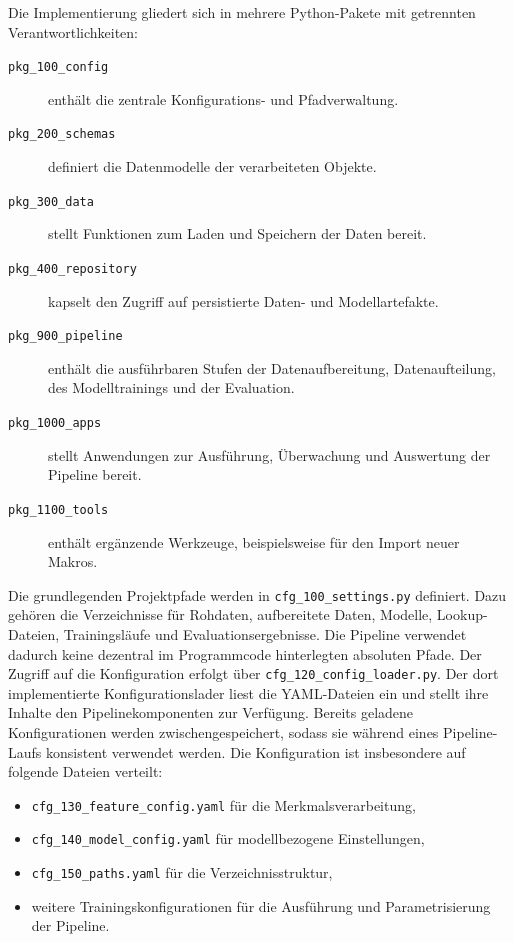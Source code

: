 Die Implementierung gliedert sich in mehrere Python-Pakete mit getrennten Verantwortlichkeiten: 
\begin{description} 
    \item[\texttt{pkg\_100\_config}] enthält die zentrale Konfigurations- und Pfadverwaltung. 
    \item[\texttt{pkg\_200\_schemas}] definiert die Datenmodelle der verarbeiteten Objekte. 
    \item[\texttt{pkg\_300\_data}] stellt Funktionen zum Laden und Speichern der Daten bereit. 
    \item[\texttt{pkg\_400\_repository}] kapselt den Zugriff auf persistierte Daten- und Modellartefakte. 
    \item[\texttt{pkg\_900\_pipeline}] enthält die ausführbaren Stufen der Datenaufbereitung, Datenaufteilung, des Modelltrainings und der Evaluation. 
    \item[\texttt{pkg\_1000\_apps}] stellt Anwendungen zur Ausführung, Überwachung und Auswertung der Pipeline bereit. 
    \item[\texttt{pkg\_1100\_tools}] enthält ergänzende Werkzeuge, beispielsweise für den Import neuer Makros. 
\end{description} 

Die grundlegenden Projektpfade werden in \texttt{cfg\_100\_settings.py} definiert. Dazu gehören die Verzeichnisse für Rohdaten, aufbereitete Daten, Modelle, Lookup-Dateien, Trainingsläufe und Evaluationsergebnisse. 
Die Pipeline verwendet dadurch keine dezentral im Programmcode hinterlegten absoluten Pfade. Der Zugriff auf die Konfiguration erfolgt über \texttt{cfg\_120\_config\_loader.py}. 
Der dort implementierte Konfigurationslader liest die YAML-Dateien ein und stellt ihre Inhalte den Pipelinekomponenten zur Verfügung. Bereits geladene Konfigurationen werden zwischengespeichert, 
sodass sie während eines Pipeline-Laufs konsistent verwendet werden. Die Konfiguration ist insbesondere auf folgende Dateien verteilt: 
\begin{itemize} 
    \item \texttt{cfg\_130\_feature\_config.yaml} für die Merkmalsverarbeitung, 
    \item \texttt{cfg\_140\_model\_config.yaml} für modellbezogene Einstellungen, 
    \item \texttt{cfg\_150\_paths.yaml} für die Verzeichnisstruktur, 
    \item weitere Trainingskonfigurationen für die Ausführung und Parametrisierung der Pipeline. 
\end{itemize} 

